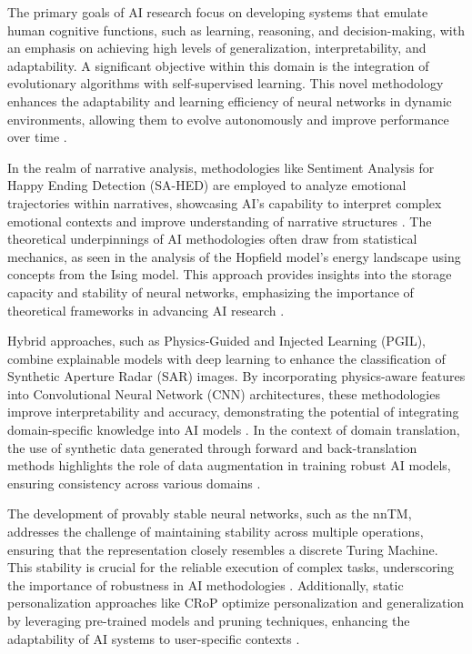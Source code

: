 The primary goals of AI research focus on developing systems that emulate human cognitive functions, such as learning, reasoning, and decision-making, with an emphasis on achieving high levels of generalization, interpretability, and adaptability. A significant objective within this domain is the integration of evolutionary algorithms with self-supervised learning. This novel methodology enhances the adaptability and learning efficiency of neural networks in dynamic environments, allowing them to evolve autonomously and improve performance over time \cite{le2019evolvingselfsupervisedneuralnetworks}.



In the realm of narrative analysis, methodologies like Sentiment Analysis for Happy Ending Detection (SA-HED) are employed to analyze emotional trajectories within narratives, showcasing AI's capability to interpret complex emotional contexts and improve understanding of narrative structures \cite{jannidis2016analyzingfeaturesdetectionhappy}. The theoretical underpinnings of AI methodologies often draw from statistical mechanics, as seen in the analysis of the Hopfield model's energy landscape using concepts from the Ising model. This approach provides insights into the storage capacity and stability of neural networks, emphasizing the importance of theoretical frameworks in advancing AI research \cite{koyama2001storagecapacitytwodimensionalneural}.



Hybrid approaches, such as Physics-Guided and Injected Learning (PGIL), combine explainable models with deep learning to enhance the classification of Synthetic Aperture Radar (SAR) images. By incorporating physics-aware features into Convolutional Neural Network (CNN) architectures, these methodologies improve interpretability and accuracy, demonstrating the potential of integrating domain-specific knowledge into AI models \cite{huang2022physicallyexplainablecnnsar}. In the context of domain translation, the use of synthetic data generated through forward and back-translation methods highlights the role of data augmentation in training robust AI models, ensuring consistency across various domains \cite{bogoychev2020domaintranslationesenoisesynthetic}.



The development of provably stable neural networks, such as the nnTM, addresses the challenge of maintaining stability across multiple operations, ensuring that the representation closely resembles a discrete Turing Machine. This stability is crucial for the reliable execution of complex tasks, underscoring the importance of robustness in AI methodologies \cite{stogin2022provablystableneuralnetwork}. Additionally, static personalization approaches like CRoP optimize personalization and generalization by leveraging pre-trained models and pruning techniques, enhancing the adaptability of AI systems to user-specific contexts \cite{kaur2024cropcontextwiserobuststatic}.



